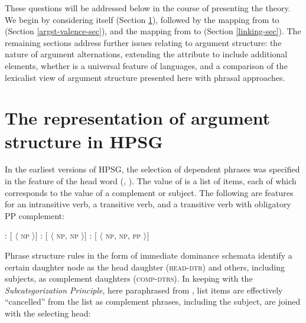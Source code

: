 \documentclass[output=paper
	        ,collection
	        ,collectionchapter
 	        ,biblatex
                ,babelshorthands
                ,newtxmath
                ,draftmode
                ,colorlinks, citecolor=brown
]{langscibook}
\begin{document}
\noindent
These questions will be addressed below in the course of presenting the theory.  We begin by considering \argst itself (Section \ref{sec:arg-st}), followed by the mapping from \argst to \val (Section \ref{argst-valence-sec}), and the mapping from \content to \argst (Section \ref{linking-sec}).  
The remaining sections address further issues relating to argument structure: the nature of argument alternations, extending the \argst attribute to include additional elements, whether \argst is a universal feature of languages, and a comparison of the lexicalist view of argument structure presented here with phrasal approaches.


\section{The representation of argument structure in HPSG}

\label{sec:arg-st}

In the earliest versions of HPSG, the selection of dependent phrases was specified in the \subcat feature  of the head word (\citealt{pollard+sag:1987}, \citealt[Chapters~1--8]{pollard+sag:1994}).  The value of \subcat is a list of items, each of which corresponds to the \synsem value of a complement or subject.  The following are \subcat features for an intransitive verb, a transitive verb, and a transitive verb with obligatory PP complement:


\begin{exe} 
\ex \label{subcats}
\begin{xlist}
\ex	{}:  $[$ \subcat $\langle$ \textsc{np} $\rangle ]$
\ex    {}:  $[$ \subcat $\langle$ \textsc{np}, \textsc{np} $\rangle ]$
\ex    {}:  $[$ \subcat $\langle$ \textsc{np}, \textsc{np}, \textsc{pp} $\rangle ]$
\end{xlist}
\end{exe}

\noindent
Phrase structure rules in the form of immediate dominance schemata  identify a certain daughter node as the head daughter (\textsc{head-dtr}) and others, including subjects, as complement daughters (\textsc{comp-dtrs}).  In keeping with the \emph{Subcategorization Principle},  here paraphrased from \cite[34]{pollard+sag:1994}, list items are effectively ``cancelled'' from the \subcat list as complement phrases, including the subject, are joined with the selecting head:
\end{document}
